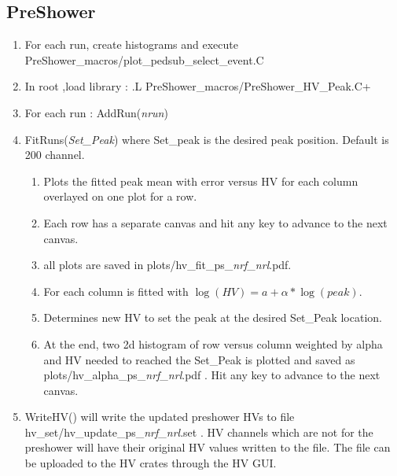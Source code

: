 \documentclass[]{article}
\begin{document}
\subsection{PreShower}
\begin{enumerate}
	\item For each run, create histograms and execute PreShower\_macros/plot\_pedsub\_select\_event.C
	\item In root ,load library : .L PreShower\_macros/PreShower\_HV\_Peak.C+
	\item For each run : AddRun({\it nrun}) 
	\item FitRuns({\it Set\_Peak}) where Set\_peak is the desired peak position. Default is 200 channel.
	\begin{enumerate}
		\item Plots the fitted peak mean with error versus HV for each column overlayed on one plot for a row. 
		\item Each row has a separate canvas and  hit any key to advance to the next canvas.
		\item all plots are saved in plots/hv\_fit\_ps\_{\it nrf}\_{\it nrl}.pdf. \item For each column is fitted with $\log(HV) = a + \alpha*\log(peak)$.
		\item Determines new HV to set the peak at the desired Set\_Peak location.
		\item  At the end, two 2d histogram of row versus column weighted by alpha and HV needed to reached the Set\_Peak is plotted and saved as plots/hv\_alpha\_ps\_{\it nrf}\_{\it nrl}.pdf . Hit any key to advance to the next canvas.
	\end{enumerate}
	\item WriteHV() will write the updated preshower HVs to  file hv\_set/hv\_update\_ps\_{\it nrf}\_{\it nrl}.set . HV channels which are not for the preshower will have their original HV values written to the file. The file can be uploaded to the HV crates through the HV GUI.
\end{enumerate}


	
	
\end{document}
